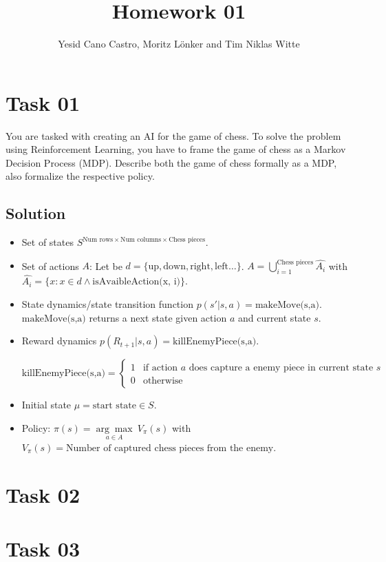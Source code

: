 \documentclass[a4paper,12pt]{scrartcl}
\title{Homework 01}
\author{Yesid Cano Castro, Moritz Lönker and Tim Niklas Witte}
\date{}
\begin{document}
{
\let\clearpage\relax
\maketitle
}

\section*{Task 01}


You are tasked with creating an AI for the game of chess. To solve the problem
using Reinforcement Learning, you have to frame the game of chess as a Markov
Decision Process (MDP). Describe both the game of chess formally as a MDP,
also formalize the respective policy.

\subsection*{Solution}

\begin{itemize}
 \item Set of states $S^{ \textrm{Num rows} \times \textrm{Num columns} \times \textrm{Chess pieces} }$.
 \item Set of actions $A$: Let be $d = \{\textrm{up}, \textrm{down}, \textrm{right}, \textrm{left}\dots\}$.
  $A = \bigcup\limits_{i=1}^{\textrm{Chess pieces}} \hat{A_i}$ with $\hat{A_i} = \{x : x\in d \land \textrm{isAvaibleAction(x, i)} \}$. 
  \item State dynamics/state transition function $p(s'|s,a) = \textrm{makeMove(s,a)}$. $\textrm{makeMove(s,a)}$ returns a next state given action $a$ and current state $s$.
  \item Reward dynamics $p(R_{t+1}|s,a) = \textrm{killEnemyPiece(s,a)}$.
  
  $
  \textrm{killEnemyPiece(s,a)} =
  \left\{
	\begin{array}{ll}
		1  & \mbox{if } \textrm{action $a$ does capture a enemy piece in current state $s$} \\
		0 & \mbox{otherwise }
	\end{array}
\right.
$
  \item Initial state $\mu = \textrm{start state} \in S$.
  
  \item Policy: $\pi(s) = \underset{a \in A}{\arg\max} \ V_\pi(s)$ with $V_\pi(s) = \textrm{Number of captured chess pieces from the enemy}$.   
\end{itemize}

\section*{Task 02}

\section*{Task 03}
\end{document}
